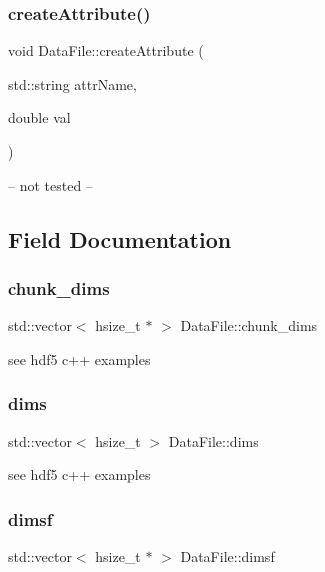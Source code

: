 \subsubsection{\texorpdfstring{create\+Attribute()}{createAttribute()}}
{\footnotesize\ttfamily void Data\+File\+::create\+Attribute (\begin{DoxyParamCaption}\item[{std\+::string}]{attr\+Name,  }\item[{double}]{val }\end{DoxyParamCaption})}

-- not tested -- 

\subsection{Field Documentation}
\mbox{\label{classDataFile_afec13483acd0763fbe2b635c5bf459f9}} 
\subsubsection{\texorpdfstring{chunk\+\_\+dims}{chunk\_dims}}
{\footnotesize\ttfamily std\+::vector$<$ hsize\+\_\+t $\ast$ $>$ Data\+File\+::chunk\+\_\+dims\hspace{0.3cm}{\ttfamily [private]}}

see hdf5 c++ examples \mbox{\label{classDataFile_affee6a54566b327d75def5fb21a9351b}} 
\subsubsection{\texorpdfstring{dims}{dims}}
{\footnotesize\ttfamily std\+::vector$<$ hsize\+\_\+t $>$ Data\+File\+::dims\hspace{0.3cm}{\ttfamily [private]}}

see hdf5 c++ examples \mbox{\label{classDataFile_a93dc46888578ba19d25940638904c678}} 
\subsubsection{\texorpdfstring{dimsf}{dimsf}}
{\footnotesize\ttfamily std\+::vector$<$ hsize\+\_\+t $\ast$ $>$ Data\+File\+::dimsf\hspace{0.3cm}{\ttfamily [private]}}

